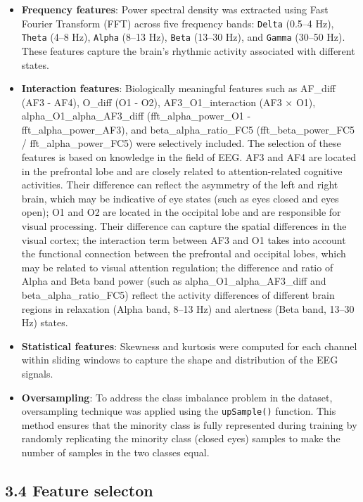 \documentclass[
  doc]{apa6}
\begin{document}
\begin{itemize}
\item
  \textbf{Frequency features}: Power spectral density was extracted using Fast Fourier Transform (FFT) across five frequency bands: \texttt{Delta} (0.5--4 Hz), \texttt{Theta} (4--8 Hz), \texttt{Alpha} (8--13 Hz), \texttt{Beta} (13--30 Hz), and \texttt{Gamma} (30--50 Hz). These features capture the brain's rhythmic activity associated with different states.
\item
  \textbf{Interaction features}: Biologically meaningful features such as AF\_diff (AF3 - AF4), O\_diff (O1 - O2), AF3\_O1\_interaction (AF3 × O1), alpha\_O1\_alpha\_AF3\_diff (fft\_alpha\_power\_O1 - fft\_alpha\_power\_AF3), and beta\_alpha\_ratio\_FC5 (fft\_beta\_power\_FC5 / fft\_alpha\_power\_FC5) were selectively included. The selection of these features is based on knowledge in the field of EEG. AF3 and AF4 are located in the prefrontal lobe and are closely related to attention-related cognitive activities. Their difference can reflect the asymmetry of the left and right brain, which may be indicative of eye states (such as eyes closed and eyes open); O1 and O2 are located in the occipital lobe and are responsible for visual processing. Their difference can capture the spatial differences in the visual cortex; the interaction term between AF3 and O1 takes into account the functional connection between the prefrontal and occipital lobes, which may be related to visual attention regulation; the difference and ratio of Alpha and Beta band power (such as alpha\_O1\_alpha\_AF3\_diff and beta\_alpha\_ratio\_FC5) reflect the activity differences of different brain regions in relaxation (Alpha band, 8--13 Hz) and alertness (Beta band, 13--30 Hz) states.
\item
  \textbf{Statistical features}: Skewness and kurtosis were computed for each channel within sliding windows to capture the shape and distribution of the EEG signals.
\item
  \textbf{Oversampling}: To address the class imbalance problem in the dataset, oversampling technique was applied using the \texttt{upSample()} function. This method ensures that the minority class is fully represented during training by randomly replicating the minority class (closed eyes) samples to make the number of samples in the two classes equal.
\end{itemize}

\subsection{3.4 Feature selecton}\label{feature-selecton}
\end{document}
